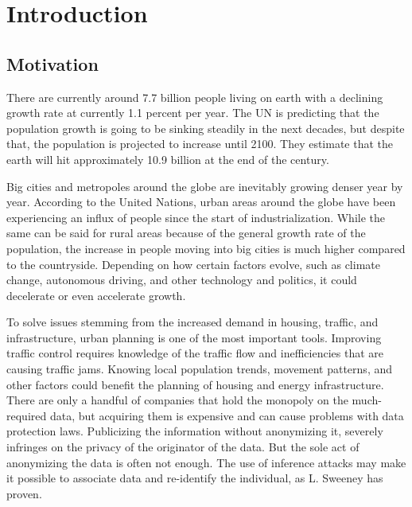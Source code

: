 
\chapter{Introduction}\label{chapter:introduction}
\section{Motivation}

There are currently around 7.7 billion people living on earth with a declining growth rate at currently 1.1 percent per year. The UN is predicting that the population growth is going to be sinking steadily in the next decades, but despite that, the population is projected to increase until 2100. They estimate that the earth will hit approximately 10.9 billion at the end of the century.

Big cities and metropoles around the globe are inevitably growing denser year by year.
According to the United Nations, urban areas around the globe have been experiencing an influx of people since the start of industrialization. While the same can be said for rural areas because of the general growth rate of the population, the increase in people moving into big cities is much higher compared to the countryside.
Depending on how certain factors evolve, such as climate change, autonomous driving, and other technology and politics, it could decelerate or even accelerate growth.

To solve issues stemming from the increased demand in housing, traffic, and infrastructure, urban planning is one of the most important tools. Improving traffic control requires knowledge of the traffic flow and inefficiencies that are causing traffic jams. Knowing local population trends, movement patterns, and other factors could benefit the planning of housing and energy infrastructure. There are only a handful of companies that hold the monopoly on the much-required data, but acquiring them is expensive and can cause problems with data protection laws. Publicizing the information without anonymizing it, severely infringes on the privacy of the originator of the data. But the sole act of anonymizing the data is often not enough. The use of inference attacks may make it possible to associate data and re-identify the individual, as L. Sweeney has proven.

